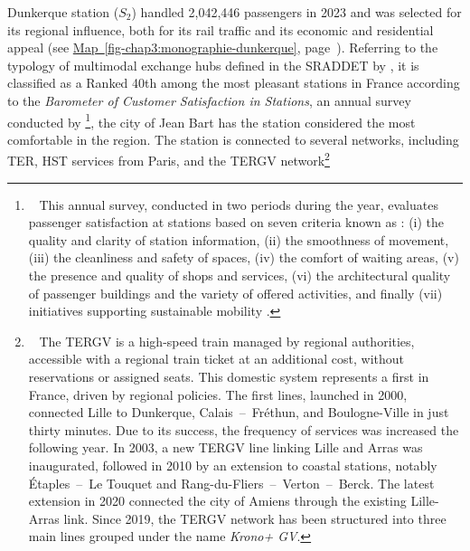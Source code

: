 \begin{refsegment}
Dunkerque station (\(S_2\)) handled 2,042,446 passengers in 2023 \textcolor{blue}{\autocite{sncf_frequentation_2024}} and was selected for its regional influence, both for its rail traffic and its economic and residential appeal (see \hyperref[fig-chap3:monographie-dunkerque]{Map~\ref{fig-chap3:monographie-dunkerque}}, page~\pageref{fig-chap3:monographie-dunkerque}). Referring to the typology of multimodal exchange hubs defined in the \acrshort{SRADDET} by \textcolor{blue}{\textcite[81]{region_hauts-de-france_sraddet_2024}}, it is classified as a  Ranked 40th among the most pleasant stations in France according to the \textsl{Barometer of Customer Satisfaction in Stations}, an annual survey conducted by \textcolor{blue}{\textcite{sncf_gares__connexions_barometre_2023}}\footnote{~
    This annual survey, conducted in two periods during the year, evaluates passenger satisfaction at stations based on seven criteria known as : (i) the quality and clarity of station information, (ii) the smoothness of movement, (iii) the cleanliness and safety of spaces, (iv) the comfort of waiting areas, (v) the presence and quality of shops and services, (vi) the architectural quality of passenger buildings and the variety of offered activities, and finally (vii) initiatives supporting sustainable mobility \textcolor{blue}{\autocite{sncf_gares__connexions_barometre_2023}}.
}, the city of Jean Bart has the station considered the most comfortable in the region. The station is connected to several networks, including \acrshort{TER}, \acrshort{HST} services from Paris, and the \acrshort{TERGV} network\footnote{~
    The \acrfull{TERGV} is a high-speed train managed by regional authorities, accessible with a regional train ticket at an additional cost, without reservations or assigned seats. This domestic system represents a first in France, driven by regional policies. The first lines, launched in 2000, connected Lille to Dunkerque, Calais~–~Fréthun, and Boulogne-Ville in just thirty minutes. Due to its success, the frequency of services was increased the following year. In 2003, a new \acrshort{TERGV} line linking Lille and Arras was inaugurated, followed in 2010 by an extension to coastal stations, notably Étaples~–~Le Touquet and Rang-du-Fliers~–~Verton~–~Berck. The latest extension in 2020 connected the city of Amiens through the existing Lille-Arras link. Since 2019, the \acrshort{TERGV} network has been structured into three main lines grouped under the name \textsl{Krono+ GV}.
}
\end{refsegment}

